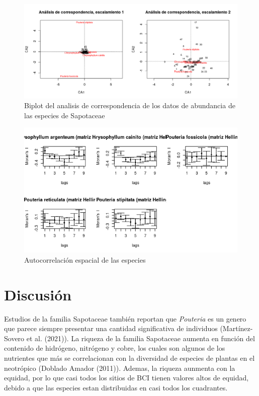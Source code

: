 \documentclass[11pt,]{article}
\begin{document}
\begin{figure}
\centering
\includegraphics[width=1.00000\textwidth]{analisis_de_correspondencia_actualizado.png}
\caption{Biplot del analisis de correspondencia de los datos de
abundancia de las especies de Sapotaceae
\label{fig:Analisis_de_correspondencia}}
\end{figure}

\begin{figure}
\centering
\includegraphics[width=1.00000\textwidth]{Abundancia_matriz.png}
\caption{Autocorrelación espacial de las especies
\label{fig:Abundancia_matriz}}
\end{figure}

\section{Discusión}\label{discusiuxf3n}

Estudios de la familia Sapotaceae también reportan que \emph{Pouteria}
es un genero que parece siempre presentar una cantidad significativa de
individuos (Martínez-Sovero et al. (2021)). La riqueza de la familia
Sapotaceae aumenta en función del contenido de hidrógeno, nitrógeno y
cobre, los cuales son algunos de los nutrientes que más se correlacionan
con la diversidad de especies de plantas en el neotrópico (Doblado
Amador (2011)). Ademas, la riqueza aunmenta con la equidad, por lo que
casi todos los sitios de BCI tienen valores altos de equidad, debido a
que las especies estan distribuidas en casi todos los cuadrantes.
\end{document}
